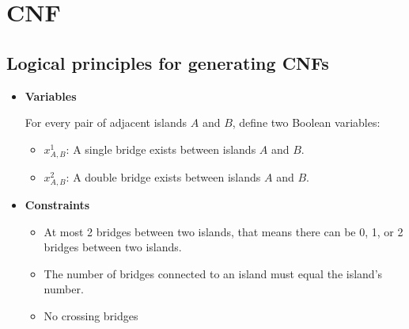 \section{CNF}
\subsection{Logical principles for generating CNFs}
\begin{itemize}
	\item \textbf{Variables}
	      \begin{flushleft}
		      For every pair of adjacent islands \(A\) and \(B\), define two Boolean variables:
		      \begin{itemize}
			      \item \(x^1_{A,B}\): A single bridge exists between islands \(A\) and \(B\).
			      \item \(x^2_{A,B}\): A double bridge exists between islands \(A\) and \(B\).
		      \end{itemize}
	      \end{flushleft}
	\item \textbf{Constraints}
	      \begin{itemize}
		      \item At most 2 bridges between two islands, that means there can be 0, 1, or 2 bridges between two islands.
		      \item The number of bridges connected to an island must equal the island's number.
		      \item No crossing bridges
	      \end{itemize}
\end{itemize}

